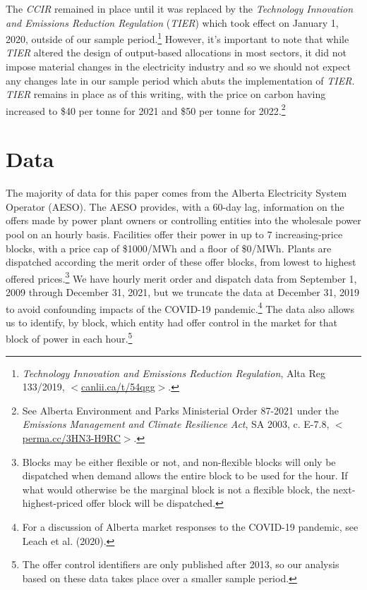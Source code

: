 \documentclass[12pt]{article}
\begin{document}
The \emph{CCIR} remained in place until it was replaced by the \emph{
Technology Innovation and Emissions Reduction Regulation} (\emph{TIER}) which took effect on January 1, 2020, outside of our sample period.\footnote{\textit{Technology Innovation and Emissions Reduction Regulation}, Alta Reg 133/2019, $<$\url{canlii.ca/t/54qgg}$>$.}  However, it's important to note that while \emph{TIER} altered the design of output-based allocations in most sectors, it did not impose material changes in the electricity industry and so we should not expect any changes late in our sample period which abuts the implementation of \emph{TIER}. \emph{TIER} remains in place as of this writing, with the price on carbon having increased to \$40 per tonne for 2021 and \$50 per tonne for 2022.\footnote{See Alberta Environment and Parks Ministerial Order 87-2021 under the \emph{Emissions Management and Climate Resilience Act}, SA 2003, c. E-7.8, $<$\url{perma.cc/3HN3-H9RC}$>$.}

\section{Data}\label{sec:data}

The majority of data for this paper comes from the Alberta Electricity System Operator (AESO). The AESO provides, with a 60-day lag, information on the offers made by power plant owners or controlling entities into the wholesale power pool on an hourly basis. Facilities offer their power in up to 7 increasing-price blocks, with a price cap of \$1000/MWh and a floor of \$0/MWh. Plants are dispatched according the merit order of these offer blocks, from lowest to highest offered prices.\footnote{Blocks may be either flexible or not, and non-flexible blocks will only be dispatched when demand allows the entire block to be used for the hour. If what would otherwise be the marginal block is not a flexible block, the next-highest-priced offer block will be dispatched.} We have hourly merit order and dispatch data from September 1, 2009 through December 31, 2021, but we truncate the data at December 31, 2019 to avoid confounding impacts of the COVID-19 pandemic.\footnote{For a discussion of Alberta market responses to the COVID-19 pandemic, see Leach et al. (2020).} The data also allows us to identify, by block, which entity had offer control in the market for that block of power in each hour.\footnote{The offer control identifiers are only published after 2013, so our analysis based on these data takes place over a smaller sample period.}
\end{document}
